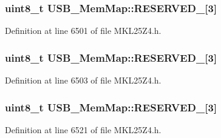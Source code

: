 \subsubsection[{\texorpdfstring{R\+E\+S\+E\+R\+V\+E\+D\+\_\+0}{RESERVED_0}}]{\setlength{\rightskip}{0pt plus 5cm}uint8\+\_\+t U\+S\+B\+\_\+\+Mem\+Map\+::\+R\+E\+S\+E\+R\+V\+E\+D\+\_\mbox{[}3\mbox{]}}\hypertarget{struct_u_s_b___mem_map_a4b7eb7f7cc53dc2ce43ba695fdee3ced}{}\label{struct_u_s_b___mem_map_a4b7eb7f7cc53dc2ce43ba695fdee3ced}


Definition at line 6501 of file M\+K\+L25\+Z4.\+h.

\subsubsection[{\texorpdfstring{R\+E\+S\+E\+R\+V\+E\+D\+\_\+1}{RESERVED_1}}]{\setlength{\rightskip}{0pt plus 5cm}uint8\+\_\+t U\+S\+B\+\_\+\+Mem\+Map\+::\+R\+E\+S\+E\+R\+V\+E\+D\+\_\mbox{[}3\mbox{]}}\hypertarget{struct_u_s_b___mem_map_ad2d7e12d4409f3ca3b795edc099698b0}{}\label{struct_u_s_b___mem_map_ad2d7e12d4409f3ca3b795edc099698b0}


Definition at line 6503 of file M\+K\+L25\+Z4.\+h.

\subsubsection[{\texorpdfstring{R\+E\+S\+E\+R\+V\+E\+D\+\_\+10}{RESERVED_10}}]{\setlength{\rightskip}{0pt plus 5cm}uint8\+\_\+t U\+S\+B\+\_\+\+Mem\+Map\+::\+R\+E\+S\+E\+R\+V\+E\+D\+\_\mbox{[}3\mbox{]}}\hypertarget{struct_u_s_b___mem_map_ae1aee1d0c478ae6ee074f614670eafd7}{}\label{struct_u_s_b___mem_map_ae1aee1d0c478ae6ee074f614670eafd7}


Definition at line 6521 of file M\+K\+L25\+Z4.\+h.

